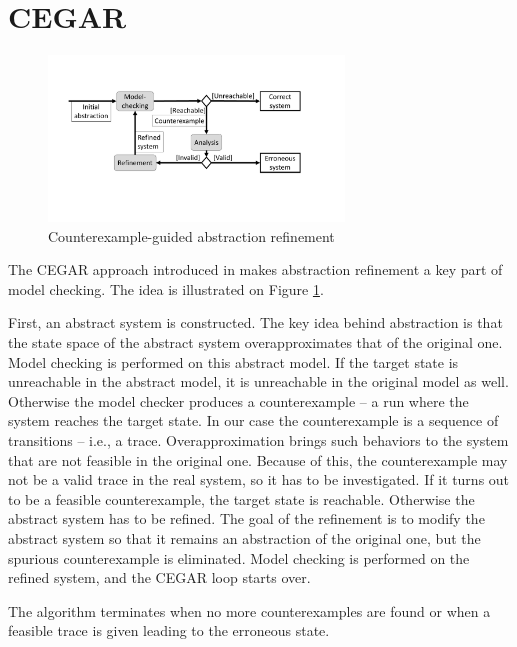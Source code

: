 \section{CEGAR}

\begin{figure} [b]
	\centering
	\includegraphics [width=0.7\textwidth] {include/figures/cegar_flow_black}
	\caption{Counterexample-guided abstraction refinement}
	\label{fig:cegar}
\end{figure}

The CEGAR approach introduced in \cite{clarke2003counterexample} makes
abstraction refinement a key part of model checking. The idea is illustrated on
Figure \ref{fig:cegar}.

First, an abstract system is constructed. The key idea behind abstraction is
that the state space of the abstract system overapproximates that of the original
one. 
Model checking is performed on this abstract model. If the target state is
unreachable in the abstract model, it is unreachable in the original model
as well. Otherwise the model checker produces a counterexample -- a run where the
system reaches the target state. In our case the counterexample is a sequence of
transitions -- i.e., a trace. Overapproximation brings such behaviors to the system that are not feasible in the original one. Because of this, the counterexample may not be a valid trace in the real system, so it has to be investigated.
If it turns
out to be a feasible counterexample, the target state is reachable. Otherwise
the abstract system has to be refined. The goal of the refinement is to modify the abstract
system so that it remains an abstraction of the original one, but the spurious
counterexample is eliminated.  Model checking is performed on the
refined system, and the CEGAR loop starts over. 

The algorithm terminates when no more
counterexamples are found or when a feasible trace is
given leading to the erroneous state.

